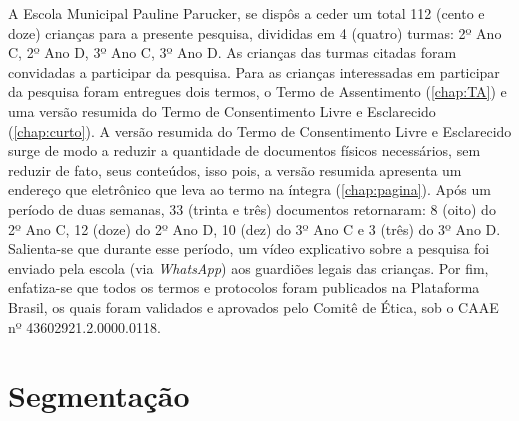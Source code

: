 A Escola Municipal Pauline Parucker, se dispôs a ceder um total 112 (cento e doze) crianças para a presente pesquisa, divididas em 4 (quatro) turmas: 2º Ano C, 2º Ano D, 3º Ano C, 3º Ano D. As crianças das turmas citadas foram convidadas a participar da pesquisa. Para as crianças interessadas em participar da pesquisa foram entregues dois termos, o Termo de Assentimento (\autoref{chap:TA}) e uma versão resumida do Termo de Consentimento Livre e Esclarecido (\autoref{chap:curto}). A versão resumida do Termo de Consentimento Livre e Esclarecido surge de modo a reduzir a quantidade de documentos físicos necessários, sem reduzir de fato, seus conteúdos, isso pois, a versão resumida apresenta um endereço que eletrônico que leva ao termo na íntegra (\autoref{chap:pagina}). Após um período de duas semanas, 33 (trinta e três) documentos retornaram: 8 (oito) do 2º Ano C, 12 (doze) do 2º Ano D, 10 (dez) do 3º Ano C e 3 (três) do 3º Ano D. Salienta-se que durante esse período, um vídeo explicativo sobre a pesquisa foi enviado pela escola (via \textit{WhatsApp}) aos guardiões legais das crianças. Por fim, enfatiza-se que todos os termos e protocolos foram publicados na Plataforma Brasil, os quais foram validados e aprovados pelo Comitê de Ética, sob o \ac{CAAE} nº 43602921.2.0000.0118.



\section{Segmentação}\label{sec:seg}


